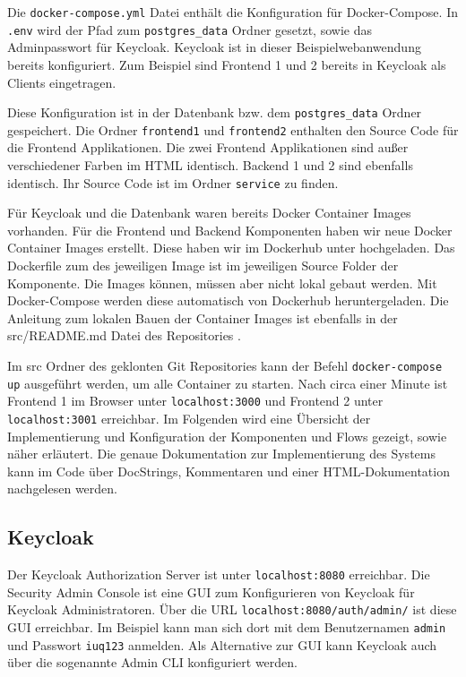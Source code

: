 Die \texttt{docker-compose.yml} Datei enthält die Konfiguration für Docker-Compose. In \texttt{.env} wird der Pfad zum \texttt{postgres\_data} Ordner gesetzt, sowie das Adminpasswort für Keycloak. Keycloak ist in dieser Beispielwebanwendung bereits konfiguriert. Zum Beispiel sind Frontend 1 und 2 bereits in Keycloak als Clients eingetragen. 

Diese Konfiguration ist in der Datenbank bzw. dem \texttt{postgres\_data} Ordner gespeichert. Die Ordner \texttt{frontend1} und \texttt{frontend2} enthalten den Source Code für die Frontend Applikationen. Die zwei Frontend Applikationen sind außer verschiedener Farben im HTML identisch. Backend 1 und 2 sind ebenfalls identisch. Ihr Source Code ist im Ordner \texttt{service} zu finden.

Für Keycloak und die Datenbank waren bereits Docker Container Images vorhanden. Für die Frontend und Backend Komponenten haben wir neue Docker Container Images erstellt. Diese haben wir im Dockerhub unter \cite{EB42} hochgeladen. Das Dockerfile zum des jeweiligen Image ist im jeweiligen Source Folder der Komponente. Die Images können, müssen aber nicht lokal gebaut werden. Mit Docker-Compose werden diese automatisch von Dockerhub heruntergeladen. Die Anleitung zum lokalen Bauen der Container Images ist ebenfalls in der src/README.md Datei des Repositories \cite{SSEB2}.

Im src Ordner des geklonten Git Repositories \cite{SSEB1} kann der Befehl \texttt{docker-compose up} ausgeführt werden, um alle Container zu starten. Nach circa einer Minute ist Frontend 1 im Browser unter \texttt{localhost:3000} und Frontend 2 unter \texttt{localhost:3001} erreichbar. Im Folgenden wird eine Übersicht der Implementierung und Konfiguration der Komponenten und Flows gezeigt, sowie näher erläutert. Die genaue Dokumentation zur Implementierung des Systems kann im Code über DocStrings, Kommentaren und einer HTML-Dokumentation nachgelesen werden.


\subsection{Keycloak} \label{EB_Keycloak}

Der Keycloak Authorization Server ist unter \texttt{localhost:8080} erreichbar. Die Security Admin Console ist eine GUI zum Konfigurieren von Keycloak für Keycloak Administratoren. Über die URL  \texttt{localhost:8080/auth/admin/} ist diese GUI erreichbar. Im Beispiel kann man sich dort mit dem Benutzernamen \texttt{admin} und Passwort \texttt{iuq123} anmelden. Als Alternative zur GUI kann Keycloak auch über die sogenannte Admin CLI konfiguriert werden.

